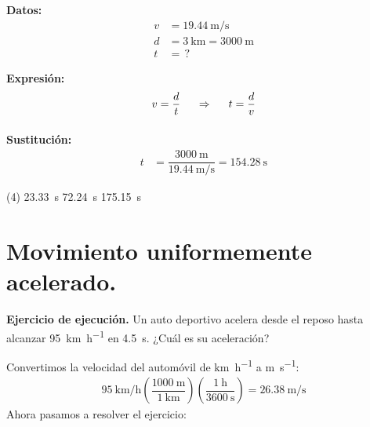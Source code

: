 \documentclass[12pt, letter]{exam}
\begin{document}
\begin{questions}
    \begin{minipage}[t]{0.35\linewidth}
    \textbf{Datos: }
    \begin{align*}
    v &= \SI{19.44}{\meter\per\second} \\
    d &= \SI{3}{\kilo\meter} = \SI{3000}{\meter} \\
    t &= \, ?
    \end{align*}
    \end{minipage}
    \hspace{1cm}
    \begin{minipage}[t]{0.4\linewidth}
    \textbf{Expresión:}
    \begin{align*}
    v &= \dfrac{d}{t} \hspace{0.5cm} \Rightarrow \hspace{0.5cm} t = \dfrac{d}{v} \\[0.5em]
    \end{align*}
    \end{minipage}

    \vspace*{0.3cm}
    \textbf{Sustitución:}
    \begin{align*}
    t &= \dfrac{\SI{3000}{\meter}}{\displaystyle \SI[per-mode=fraction]{19.44}{\meter\per\second}} = \SI{154.28}{\second}
    \end{align*}
    \begin{tasks}(4)
        \task \SI{23.33}{\second}
        \task \SI{72.24}{\second}
        \task {}
        \task \SI{175.15}{\second}
    \end{tasks}


    \section{Movimiento uniformemente acelerado.}

    \setcounter{question}{6} \question \textbf{Ejercicio de ejecución.} Un auto deportivo acelera desde el reposo hasta alcanzar \SI{95}{\kilo\meter\per\hour} en \SI{4.5}{\second}. ¿Cuál es su aceleración?

    \vspace*{0.25cm}
    Convertimos la velocidad del automóvil de \unit{\kilo\meter\per\hour} a \unit{\meter\per\second}:
    \begin{align*}
        \SI[per-mode=fraction]{95}{\kilo\meter\per\hour} \left( \dfrac{\SI{1000}{\meter}}{\SI{1}{\kilo\meter}} \right) \left( \dfrac{\SI{1}{\hour}}{\SI{3600}{\second}} \right) = \SI[per-mode=fraction]{26.38}{\meter\per\second}
    \end{align*}
    Ahora pasamos a resolver el ejercicio:


\end{questions}
\end{document}
